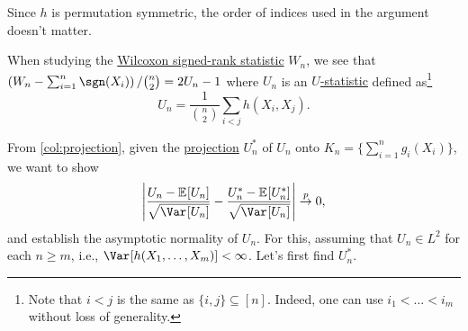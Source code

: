 \begin{note}
	Since \(h\) is permutation symmetric, the order of indices used in the argument doesn't matter.
\end{note}

\begin{eg}
	When studying the \hyperref[def:Wilcoxon-signed-rank-statistic]{Wilcoxon signed-rank statistic} \(W_n\), we see that \(\left( W_n - \sum_{i=1}^{n} \sgn (X_i) \right) / \binom{n}{2} = 2U_n - 1\) where \(U_n\) is an \hyperref[def:U-statistic]{\(U\)-statistic} defined as\footnote{Note that \(i < j\) is the same as \(\{ i, j \} \subseteq [n] \). Indeed, one can use \(i_1 < \dots < i_m\) without loss of generality.}
	\[
		U_n = \frac{1}{\binom{n}{2}} \sum_{i < j} h(X_i, X_j).
	\]
\end{eg}

From \autoref{col:projection}, given the \hyperref[def:projection]{projection} \(U_n^{\ast} \) of \(U_n\) onto \(K_n = \{ \sum_{i=1}^{n} g_i(X_i) \} \), we want to show
\[
	\left\vert \frac{U_n - \mathbb{E}_{}[U_n] }{\sqrt{\Var_{}[U_n] } } - \frac{U_n^{\ast} - \mathbb{E}_{}[U_n^{\ast} ] }{\sqrt{\Var_{}[U_n] } } \right\vert
	\overset{p}{\to} 0,
\]
and establish the asymptotic normality of \(U_n\). For this, assuming that \(U_n \in L^2\) for each \(n \geq m\), i.e., \(\Var_{}[h(X_1, \dots , X_m)] < \infty \). Let's first find \(U_n^{\ast} \).

